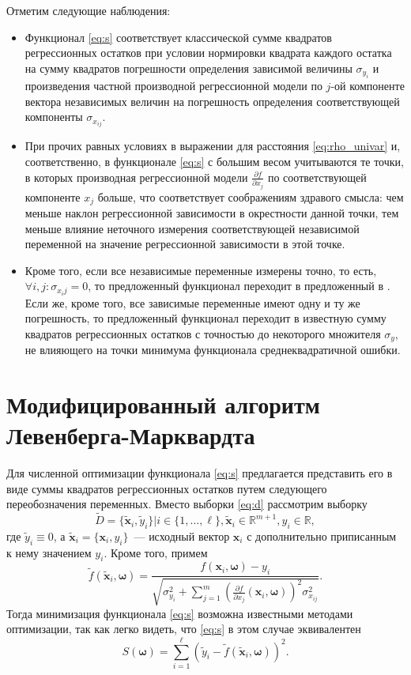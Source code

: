\documentclass[tikz,11pt,a4paper]{article}
\newcommand{\bomega}{\boldsymbol{\omega}}
\begin{document}
Отметим следующие наблюдения:
\begin{itemize}
  \item Функционал \eqref{eq:s} соответствует классической сумме квадратов регрессионных
	остатков при условии нормировки квадрата каждого остатка на сумму квадратов погрешности
	определения зависимой величины $\sigma_{y_i}$ и произведения частной производной
	регрессионной модели по $j$-ой компоненте вектора независимых величин на погрешность
	определения соответствующей компоненты $\sigma_{x_{ij}}$.

  \item При прочих равных условиях в выражении для расстояния \eqref{eq:rho_univar} и,
	соответственно, в функционале \eqref{eq:s} с большим весом учитываются те точки, в которых
	производная регрессионной модели $\frac{\partial f}{\partial x_j}$ по соответствующей
	компоненте $x_j$ больше, что соответствует соображениям здравого смысла: чем меньше наклон
	регрессионной зависимости в окрестности данной точки, тем меньше влияние неточного
	измерения соответствующей независимой переменной на значение регрессионной зависимости
	в этой точке.

  \item Кроме того, если все независимые переменные измерены точно, то есть,
	$\forall i, j : \sigma_{x_ij} = 0$, то предложенный функционал переходит в предложенный
	в \cite{jukic2013nonlinear}. Если же, кроме того, все зависимые переменные имеют одну и ту же погрешность,
	то предложенный функционал переходит в известную сумму квадратов регрессионных остатков
	с точностью до некоторого множителя $\sigma_y$, не влияющего на точки минимума функционала
	среднеквадратичной ошибки.
\end{itemize}

\section{Модифицированный алгоритм Левенберга-Марквардта}

Для численной оптимизации функционала \eqref{eq:s} предлагается представить его в виде
суммы квадратов регрессионных остатков путем следующего переобозначения переменных.
Вместо выборки \eqref{eq:d}
рассмотрим выборку
\[
  \tilde{D} = \{ \tilde{\mathbf{x}}_i, \tilde{y}_i \} | i \in \{ 1, \dots, \ell \}, \tilde{\mathbf{x}}_i \in \mathbb{R}^{m + 1}, y_i \in \mathbb{R},
\]
где $\tilde{y}_i \equiv 0$, а
$\tilde{\mathbf{x}}_i = \{ \mathbf{x}_i, y_i \}$~--- исходный вектор $\mathbf{x}_i$
с дополнительно приписанным к нему значением $y_i$. Кроме того, примем
\[
  \tilde{f}(\tilde{\mathbf{x}}_i, \bomega) = \frac{f(\mathbf{x}_i, \bomega) - y_i}{\sqrt{\sigma_{y_i}^2 + \sum_{j = 1}^m (\frac{\partial f}{\partial x_j}(\mathbf{x}_i, \bomega))^2 \sigma^2_{x_{ij}}}}.
\]
Тогда минимизация функционала \eqref{eq:s} возможна известными методами оптимизации, так
как легко видеть, что \eqref{eq:s} в этом случае эквивалентен
\[
  S(\bomega) = \sum_{i = 1}^\ell (\tilde{y}_i - \tilde{f}(\tilde{\mathbf{x}}_i, \bomega))^2.
\]
\end{document}

